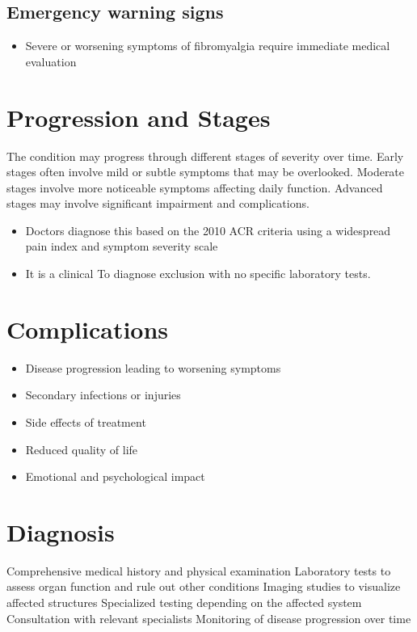 \subsection{Emergency warning signs}
\begin{itemize}[noitemsep]
  \item Severe or worsening symptoms of fibromyalgia require immediate medical evaluation
\end{itemize}
\section{Progression and Stages}
The condition may progress through different stages of severity over time. Early stages often involve mild or subtle symptoms that may be overlooked. Moderate stages involve more noticeable symptoms affecting daily function. Advanced stages may involve significant impairment and complications.

\begin{itemize}[noitemsep]
  \item Doctors diagnose this based on the 2010 ACR criteria using a widespread pain index and symptom severity scale
  \item It is a clinical To diagnose exclusion with no specific laboratory tests.
\end{itemize}
\section{Complications}
\begin{itemize}[noitemsep]
  \item Disease progression leading to worsening symptoms
  \item Secondary infections or injuries
  \item Side effects of treatment
  \item Reduced quality of life
  \item Emotional and psychological impact
\end{itemize}
\section{Diagnosis}
Comprehensive medical history and physical examination Laboratory tests to assess organ function and rule out other conditions Imaging studies to visualize affected structures Specialized testing depending on the affected system Consultation with relevant specialists Monitoring of disease progression over time

